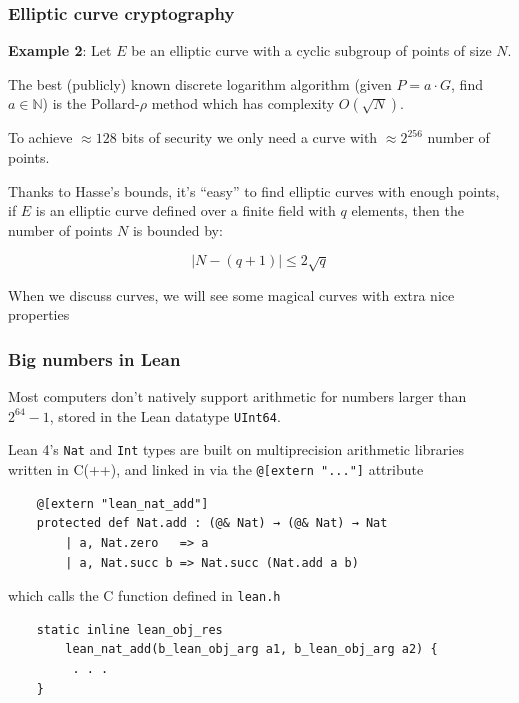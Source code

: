 \documentclass[options]{beamer}
\begin{document}
\begin{frame}
    \frametitle{Elliptic curve cryptography}

    
    {\bf Example 2}: Let $E$ be an elliptic curve with a cyclic subgroup of points of size $N$.
    
    The best (publicly) known discrete logarithm algorithm (given $P = a \cdot G$, find $a \in \mathbb{N}$) is the Pollard-$\rho$ method which has complexity $O(\sqrt{N})$.

    To achieve $\approx 128$ bits of security we only need a curve with $\approx 2^{256}$ number of points.

    Thanks to Hasse's bounds, it's ``easy'' to find elliptic curves with enough points, if $E$ is an elliptic curve defined over a finite field with $q$ elements, then the number of points $N$ is bounded by:

    $$\left| N - (q + 1)\right| \leq 2 \sqrt{q}$$

    When we discuss curves, we will see some magical curves with extra nice properties

\end{frame}
\begin{frame}[fragile]
    \frametitle{Big numbers in Lean}

    Most computers don't natively support arithmetic for numbers larger than $2^{64} - 1$, stored in the Lean datatype \verb+UInt64+.

    Lean 4's \verb+Nat+ and \verb+Int+ types are built on multiprecision arithmetic libraries written in C(++), and linked in via the \verb+@[extern "..."]+ attribute
    \begin{verbatim}
    @[extern "lean_nat_add"]
    protected def Nat.add : (@& Nat) → (@& Nat) → Nat
        | a, Nat.zero   => a
        | a, Nat.succ b => Nat.succ (Nat.add a b)
    \end{verbatim}
    
    which calls the C function defined in \verb+lean.h+

    \begin{verbatim}
    static inline lean_obj_res 
        lean_nat_add(b_lean_obj_arg a1, b_lean_obj_arg a2) {
         . . .
    }
    \end{verbatim}
\end{frame}
\end{document}
